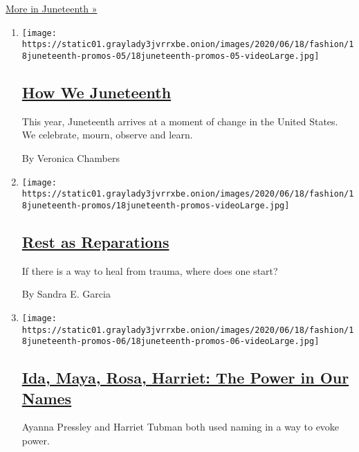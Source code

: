 \href{/issue/style/2020/06/18/juneteenth}{More in Juneteenth »}

\begin{enumerate}
\def\labelenumi{\arabic{enumi}.}
\item
  \texttt{[image: https://static01.graylady3jvrrxbe.onion/images/2020/06/18/fashion/18juneteenth-promos-05/18juneteenth-promos-05-videoLarge.jpg]}

  \hypertarget{how-we-juneteenth}{%
  \subsection{\texorpdfstring{\href{/interactive/2020/06/18/style/juneteenth-celebration.html}{How
  We Juneteenth}}{How We Juneteenth}}\label{how-we-juneteenth}}

  This year, Juneteenth arrives at a moment of change in the United
  States. We celebrate, mourn, observe and learn.

  By Veronica Chambers
\item
  \texttt{[image: https://static01.graylady3jvrrxbe.onion/images/2020/06/18/fashion/18juneteenth-promos/18juneteenth-promos-videoLarge.jpg]}

  \hypertarget{rest-as-reparations}{%
  \subsection{\texorpdfstring{\href{/2020/06/18/style/self-care/healing-trauma-racism-wellness.html}{Rest
  as Reparations}}{Rest as Reparations}}\label{rest-as-reparations}}

  If there is a way to heal from trauma, where does one start?

  By Sandra E. Garcia
\item
  \texttt{[image: https://static01.graylady3jvrrxbe.onion/images/2020/06/18/fashion/18juneteenth-promos-06/18juneteenth-promos-06-videoLarge.jpg]}

  \hypertarget{ida-maya-rosa-harriet-the-power-in-our-names}{%
  \subsection{\texorpdfstring{\href{/2020/06/18/style/self-care/sojourner-truth-harriet-tubman-slavery-names.html}{Ida,
  Maya, Rosa, Harriet: The Power in Our
  Names}}{Ida, Maya, Rosa, Harriet: The Power in Our Names}}\label{ida-maya-rosa-harriet-the-power-in-our-names}}

  Ayanna Pressley and Harriet Tubman both used naming in a way to evoke
  power.


\end{enumerate}
